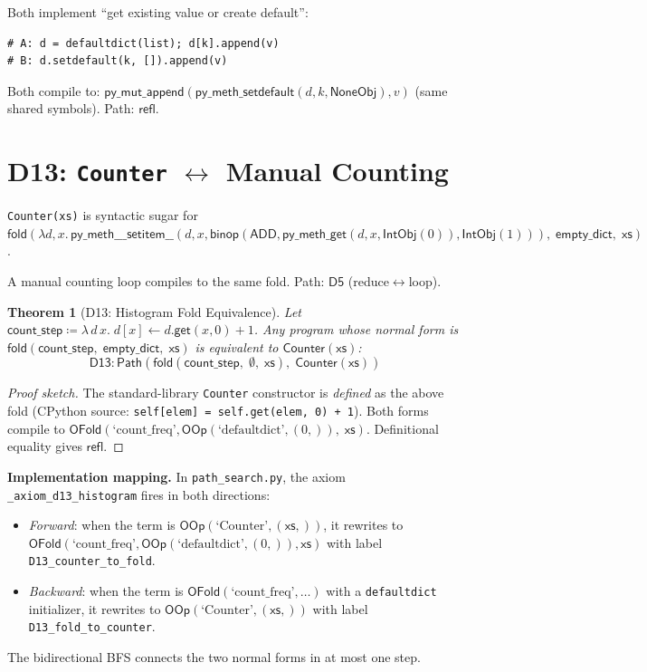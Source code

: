 \documentclass[11pt,a4paper]{report}
\theoremstyle{definition}
\theoremstyle{plain}
\newtheorem{theorem}[definition]{Theorem}
\newcommand{\Path}{\mathsf{Path}}
\newcommand{\fold}{\mathsf{fold}}
\begin{document}
Both implement ``get existing value or create default'':
\begin{lstlisting}
# A: d = defaultdict(list); d[k].append(v)
# B: d.setdefault(k, []).append(v)
\end{lstlisting}

Both compile to: $\mathsf{py\_mut\_append}(\mathsf{py\_meth\_setdefault}(d, k,
\mathsf{NoneObj}), v)$ (same shared symbols).  Path: $\mathsf{refl}$.

\section{D13: \texttt{Counter} $\leftrightarrow$ Manual Counting}
\label{sec:d13-counter}

\texttt{Counter(xs)} is syntactic sugar for
$\fold(\lambda d,x.\, \mathsf{py\_meth\_\_\_setitem\_\_}(d, x,
\mathsf{binop}(\mathsf{ADD}, \mathsf{py\_meth\_get}(d, x,
\mathsf{IntObj}(0)), \mathsf{IntObj}(1))),\; \mathsf{empty\_dict},\;
\mathsf{xs})$.

A manual counting loop compiles to the same fold.  Path:
$\mathsf{D5}$ (reduce$\leftrightarrow$loop).

\begin{theorem}[D13: Histogram Fold Equivalence]
\label{thm:d13-histogram}
Let $\mathsf{count\_step} \coloneqq \lambda\, d\, x.\;
d[x] \leftarrow d.\mathsf{get}(x, 0) + 1$.
Any program whose normal form is
$\fold(\mathsf{count\_step},\;\mathsf{empty\_dict},\;\mathsf{xs})$
is equivalent to $\mathsf{Counter}(\mathsf{xs})$:
\[
  \mathsf{D13} : \Path\!\left(
    \fold(\mathsf{count\_step},\; \emptyset,\; \mathsf{xs}),\;
    \mathsf{Counter}(\mathsf{xs})
  \right)
\]
\end{theorem}

\begin{proof}[Proof sketch]
The standard-library \texttt{Counter} constructor is \emph{defined}
as the above fold (CPython source: \texttt{self[elem] = self.get(elem,
0) + 1}).  Both forms compile to $\mathsf{OFold}(\text{`count\_freq'},
\mathsf{OOp}(\text{`defaultdict'}, (0,)),\; \mathsf{xs})$.
Definitional equality gives $\mathsf{refl}$.
\end{proof}

\textbf{Implementation mapping.}
In \texttt{path\_search.py}, the axiom \texttt{\_axiom\_d13\_histogram}
fires in both directions:
\begin{itemize}
  \item \emph{Forward}: when the term is $\mathsf{OOp}(\text{`Counter'},
    (\mathsf{xs},))$, it rewrites to
    $\mathsf{OFold}(\text{`count\_freq'}, \mathsf{OOp}(\text{`defaultdict'},
    (0,)), \mathsf{xs})$ with label \texttt{D13\_counter\_to\_fold}.
  \item \emph{Backward}: when the term is
    $\mathsf{OFold}(\text{`count\_freq'}, \ldots)$ with a
    \texttt{defaultdict} initializer, it rewrites to
    $\mathsf{OOp}(\text{`Counter'}, (\mathsf{xs},))$ with label
    \texttt{D13\_fold\_to\_counter}.
\end{itemize}
The bidirectional BFS connects the two normal forms in at most one step.
\end{document}
